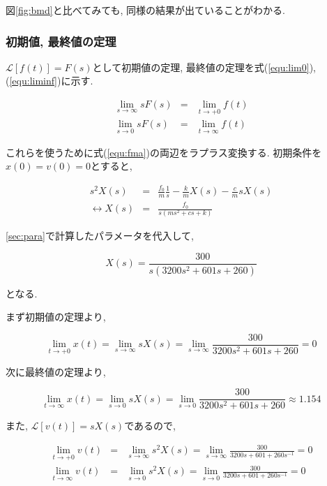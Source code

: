 \documentclass[titlepage]{jsarticle}
\begin{document}
            図\ref{fig:bmd}と比べてみても, 同様の結果が出ていることがわかる.
            
        \subsubsection{初期値, 最終値の定理}
            $\mathcal{L}[f(t)] = F(s)$として初期値の定理, 最終値の定理を式(\ref{equ:lim0}), (\ref{equ:liminf})に示す.

            \begin{eqnarray}
                \lim_{s \to \infty} sF(s) &=& \lim_{t \to +0} f(t) \label{equ:lim0} \\
                \lim_{s \to 0} sF(s) &=& \lim_{t \to \infty} f(t) \label{equ:liminf}
            \end{eqnarray}

            これらを使うために式(\ref{equ:fma})の両辺をラプラス変換する.
            初期条件を$x(0) = v(0) = 0$とすると,

            \begin{eqnarray*}
                s^2 X(s) &=& \frac{f_0}{m} \frac{1}{s} - \frac{k}{m} X(s) - \frac{c}{m} sX(s) \\
                \leftrightarrow X(s) &=& \frac{f_0}{s(ms^2+cs+k)}
            \end{eqnarray*}

            \ref{sec:para}で計算したパラメータを代入して,
            
            \begin{equation}
                X(s) = \frac{300}{s(3200s^2+601s+260)} \label{equ:lap}
            \end{equation}

            となる.

            まず初期値の定理より,

            \[
                \lim_{t \to +0} x(t) = \lim_{s \to \infty} sX(s) = \lim_{s \to \infty} \frac{300}{3200s^2+601s+260} = 0
            \]

            次に最終値の定理より,

            \[
                \lim_{t \to \infty} x(t) = \lim_{s \to 0} sX(s) = \lim_{s \to 0} \frac{300}{3200s^2+601s+260} \approx 1.154
            \]

            また, $\mathcal{L}[v(t)] = sX(s)$であるので,

            \begin{eqnarray*}
                \lim_{t \to +0} v(t) &=& \lim_{s \to \infty} s^2X(s) = \lim_{s \to \infty} \frac{300}{3200s+601+260s^{-1}} = 0 \\
                \lim_{t \to \infty} v(t) &=& \lim_{s \to 0} s^2X(s) = \lim_{s \to 0} \frac{300}{3200s+601+260s^{-1}} = 0
            \end{eqnarray*}
\end{document}
